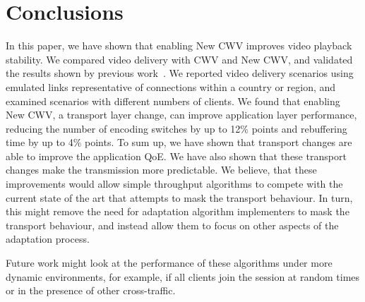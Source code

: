 \documentclass[10pt,sigconf]{acmart}
\begin{document}
\section{Conclusions}
\label{sec:conclusion}

In this paper, we have shown that enabling New CWV improves video playback stability. We compared video delivery with CWV and New CWV, and validated the results shown by previous work~\cite{Nazir-2014-performance-evaluation-congestion-window-validation-dash-newcwv}. We reported video delivery scenarios using emulated links representative of connections within a country or region, and examined scenarios with different numbers of clients. We found that enabling New CWV, a transport layer change, can improve application layer performance, reducing the number of encoding switches by up to 12\% points and rebuffering time by up to 4\% points. To sum up, we have shown that transport changes are able to improve the application QoE. We have also shown that these transport changes make the transmission more predictable. We believe, that these improvements would allow simple throughput algorithms to compete with the current state of the art that attempts to mask the transport behaviour. In turn, this might remove the need for adaptation algorithm implementers to mask the transport behaviour, and instead allow them to focus on other aspects of the adaptation process. 

Future work might look at the performance of these algorithms under more dynamic environments, for example, if all clients join the session at random times or in the presence of other cross-traffic.




\end{document}
